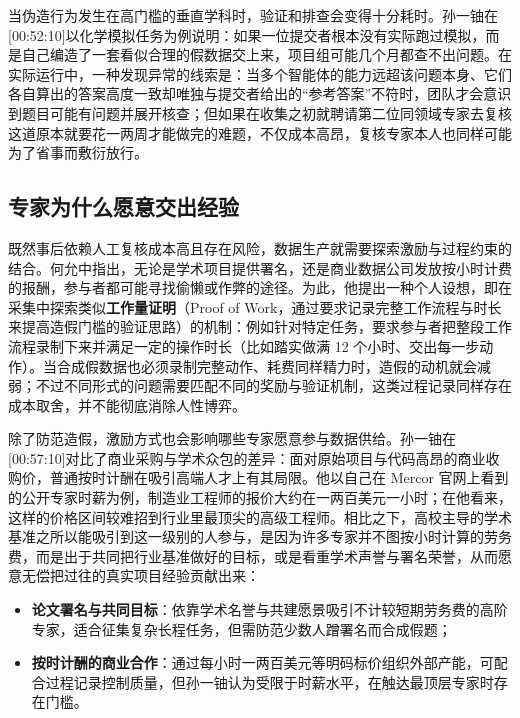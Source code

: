 \documentclass[UTF8,a4paper,11pt,fontset=fandol]{ctexart}
\begin{document}
当伪造行为发生在高门槛的垂直学科时，验证和排查会变得十分耗时。孙一铀在[00:52:10]以化学模拟任务为例说明：如果一位提交者根本没有实际跑过模拟，而是自己编造了一套看似合理的假数据交上来，项目组可能几个月都查不出问题。在实际运行中，一种发现异常的线索是：当多个智能体的能力远超该问题本身、它们各自算出的答案高度一致却唯独与提交者给出的“参考答案”不符时，团队才会意识到题目可能有问题并展开核查；但如果在收集之初就聘请第二位同领域专家去复核这道原本就要花一两周才能做完的难题，不仅成本高昂，复核专家本人也同样可能为了省事而敷衍放行。

\subsection{专家为什么愿意交出经验}
既然事后依赖人工复核成本高且存在风险，数据生产就需要探索激励与过程约束的结合。何允中指出，无论是学术项目提供署名，还是商业数据公司发放按小时计费的报酬，参与者都可能寻找偷懒或作弊的途径。为此，他提出一种个人设想，即在采集中探索类似\textbf{工作量证明}（Proof of Work，通过要求记录完整工作流程与时长来提高造假门槛的验证思路）的机制：例如针对特定任务，要求参与者把整段工作流程录制下来并满足一定的操作时长（比如踏实做满 12 个小时、交出每一步动作）。当合成假数据也必须录制完整动作、耗费同样精力时，造假的动机就会减弱；不过不同形式的问题需要匹配不同的奖励与验证机制，这类过程记录同样存在成本取舍，并不能彻底消除人性博弈。

除了防范造假，激励方式也会影响哪些专家愿意参与数据供给。孙一铀在[00:57:10]对比了商业采购与学术众包的差异：面对原始项目与代码高昂的商业收购价，普通按时计酬在吸引高端人才上有其局限。他以自己在 Mercor 官网上看到的公开专家时薪为例，制造业工程师的报价大约在一两百美元一小时；在他看来，这样的价格区间较难招到行业里最顶尖的高级工程师。相比之下，高校主导的学术基准之所以能吸引到这一级别的人参与，是因为许多专家并不图按小时计算的劳务费，而是出于共同把行业基准做好的目标，或是看重学术声誉与署名荣誉，从而愿意无偿把过往的真实项目经验贡献出来：
\begin{itemize}
\item \textbf{论文署名与共同目标}：依靠学术名誉与共建愿景吸引不计较短期劳务费的高阶专家，适合征集复杂长程任务，但需防范少数人蹭署名而合成假题；
\item \textbf{按时计酬的商业合作}：通过每小时一两百美元等明码标价组织外部产能，可配合过程记录控制质量，但孙一铀认为受限于时薪水平，在触达最顶层专家时存在门槛。
\end{itemize}
\end{document}
